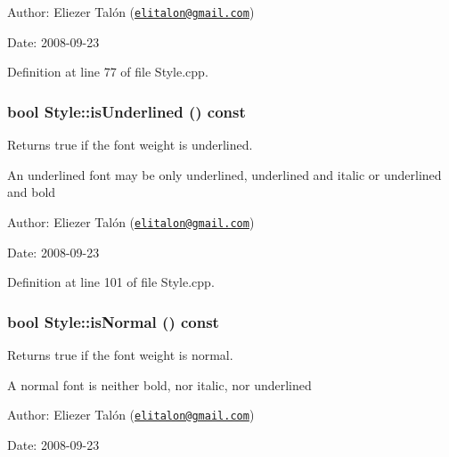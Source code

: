 \begin{Desc}
\item[Author:]Eliezer Talón (\href{mailto:elitalon@gmail.com}{\tt elitalon@gmail.com}) \end{Desc}
\begin{Desc}
\item[Date:]2008-09-23 \end{Desc}


Definition at line 77 of file Style.cpp.\hypertarget{class_style_d1fcc32d8b565aae007012eb603fedcd}{
\subsubsection[isUnderlined]{\setlength{\rightskip}{0pt plus 5cm}bool Style::isUnderlined () const}}
\label{class_style_d1fcc32d8b565aae007012eb603fedcd}


Returns true if the font weight is underlined. 

An underlined font may be only underlined, underlined and italic or underlined and bold

\begin{Desc}
\item[Author:]Eliezer Talón (\href{mailto:elitalon@gmail.com}{\tt elitalon@gmail.com}) \end{Desc}
\begin{Desc}
\item[Date:]2008-09-23 \end{Desc}


Definition at line 101 of file Style.cpp.\hypertarget{class_style_db2cbc7ca50b2f5c632c8e9b0420044c}{
\subsubsection[isNormal]{\setlength{\rightskip}{0pt plus 5cm}bool Style::isNormal () const}}
\label{class_style_db2cbc7ca50b2f5c632c8e9b0420044c}


Returns true if the font weight is normal. 

A normal font is neither bold, nor italic, nor underlined

\begin{Desc}
\item[Author:]Eliezer Talón (\href{mailto:elitalon@gmail.com}{\tt elitalon@gmail.com}) \end{Desc}
\begin{Desc}
\item[Date:]2008-09-23 \end{Desc}


